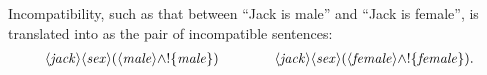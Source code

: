 
Incompatibility, such as that between ``Jack is male'' and ``Jack is
female'', is translated into \cathoristic{} as the pair of incompatible
sentences:
\begin{eqnarray*}
\langle \mathit{jack} \rangle \langle \mathit{sex} \rangle (\langle \mathit{male} \rangle \land ! \{\mathit{male}\}) 
   \qquad\qquad
\langle \mathit{jack} \rangle \langle \mathit{sex} \rangle (\langle \mathit{female} \rangle \land ! \{\mathit{female}\}).
\end{eqnarray*}

